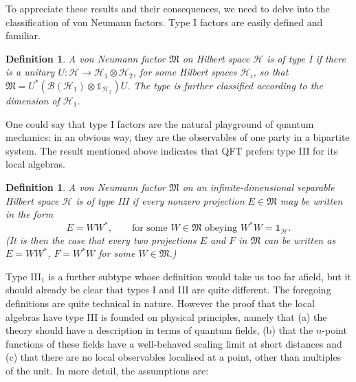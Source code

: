 \documentclass[12pt]{article}
\newcommand{\1}{\mathds{1}}                         %
\newcommand{\HH}{{\mathcal{H}}}
\newcommand{\Mf}{{\mathfrak{M}}}
\newcommand{\II}{{\mathbb{1}}}
\newcommand{\Bc}{{\mathcal{B}}}
\newtheorem{definition}[theorem]{Definition}
\begin{document}
 



To appreciate these results and their consequences, we need to delve into the classification of von Neumann factors. Type I factors are easily defined and familiar.
\begin{definition}\label{def:typeI}
	A von Neumann factor $\Mf$ on Hilbert space $\HH$ is of \emph{type I} if there is a unitary $U:\HH\to\HH_1\otimes\HH_2$, for some Hilbert spaces $\HH_i$, so that $\Mf=U^*(\Bc(\HH_1)\otimes\II_{\HH_2}) U$. 
	The type is further classified according to the dimension of $\HH_1$.
\end{definition}
One could say that type I factors are the natural playground of quantum mechanics: in an obvious way, they are the observables of one party in a bipartite system.
The result mentioned above indicates that QFT prefers type III for its local algebras.
\begin{definition}
	A von Neumann factor $\Mf$ on an infinite-dimensional separable Hilbert space $\HH$ is of \emph{type III} if every nonzero projection $E\in\Mf$ may be written in the form 
	\[
	E = WW^*, \qquad \text{for some $W\in\Mf$ obeying $W^*W=\II_\HH$.}
	\]
	(It is then the case that every two projections $E$ and $F$ in $\Mf$ can be written as $E=WW^*$, $F=W^*W$ for some $W\in\Mf$.) 
\end{definition} 
Type III${}_1$ is a further subtype whose definition would take us too far afield, but it should already be clear that types I and III are quite different. The foregoing definitions are quite technical in nature. However the proof that the local algebras have type III is founded on physical principles, namely that (a) the theory should have a description in terms of quantum fields, (b) that the $n$-point functions of these fields have a well-behaved scaling limit at short distances and (c) that there are no local observables localised at a point, other than multiples of the unit. In more detail, the assumptions are:
\end{document}

